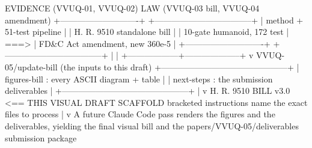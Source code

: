 \documentclass[11pt]{article}
\begin{document}
\begin{asciifig}
  EVIDENCE (VVUQ-01, VVUQ-02)         LAW (VVUQ-03 bill, VVUQ-04 amendment)
  +----------------------------+      +-----------------------------------+
  | method + 51-test pipeline  |      | H. R. 9510 standalone bill        |
  | 10-gate humanoid, 172 test | ===> | FD&C Act amendment, new 360e-5    |
  +----------------------------+      +-----------------------------------+
               |                                       |
               +------------------+--------------------+
                                  v
             VVUQ-05/update-bill  (the inputs to this draft)
             +---------------------------------------------+
             | figures-bill : every ASCII diagram + table  |
             | next-steps   : the submission deliverables  |
             +---------------------------------------------+
                                  |
                                  v
         H. R. 9510 BILL v3.0   <== THIS VISUAL DRAFT SCAFFOLD
         bracketed instructions name the exact files to process
                                  |
                                  v
         A future Claude Code pass renders the figures and the
         deliverables, yielding the final visual bill and the
         papers/VVUQ-05/deliverables submission package
\end{asciifig}

\clearpage
{}



\end{document}
